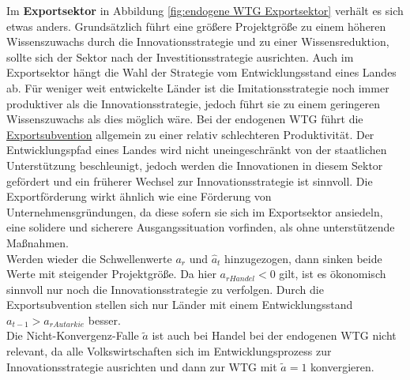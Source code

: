 %
Im \textbf{Exportsektor} in Abbildung \ref{fig:endogene WTG Exportsektor} verhält es sich etwas anders. Grundsätzlich führt eine größere Projektgröße zu einem höheren Wissenszuwachs durch die \textcolor[rgb]{0.74,0.97,0.22}{Innovationsstrategie} und zu einer Wissensreduktion, sollte sich der Sektor nach der \textcolor[rgb]{0,0.32,0}{Investitionsstrategie} ausrichten. Auch im Exportsektor hängt die Wahl der Strategie vom Entwicklungsstand eines Landes ab. Für weniger weit entwickelte Länder ist die \textcolor[rgb]{0,0.32,0}{Imitationsstrategie} noch immer produktiver als die \textcolor[rgb]{0.74,0.97,0.22}{Innovationsstrategie}, jedoch führt sie zu einem geringeren Wissenszuwachs als dies  möglich wäre. Bei der endogenen WTG führt die \uline{Exportsubvention} allgemein zu einer relativ schlechteren Produktivität. Der Entwicklungspfad eines Landes wird nicht uneingeschränkt von der staatlichen Unterstützung beschleunigt, jedoch werden die Innovationen in diesem Sektor gefördert und ein früherer Wechsel zur \textcolor[rgb]{0.74,0.97,0.22}{Innovationsstrategie} ist sinnvoll. Die Exportförderung wirkt ähnlich wie eine Förderung von Unternehmensgründungen, da diese sofern sie sich im Exportsektor ansiedeln, eine solidere und sicherere Ausgangssituation vorfinden, als ohne unterstützende Maßnahmen.\\
%
Werden wieder die Schwellenwerte $a_r$ und $\hat{a}_t$ hinzugezogen, dann sinken beide Werte mit steigender Projektgröße. Da hier $a_{rHandel}<0$ gilt, ist es ökonomisch sinnvoll nur noch die \textcolor[rgb]{0.74,0.97,0.22}{Innovationsstrategie} zu verfolgen. Durch die Exportsubvention stellen sich nur Länder mit einem Entwicklungsstand $a_{t-1}>a_{rAutarkie}$ besser.\\
%
Die Nicht-Konvergenz-Falle $\tilde{a}$ ist auch bei Handel bei der endogenen WTG nicht relevant, da alle Volkswirtschaften sich im Entwicklungsprozess zur Innovationsstrategie ausrichten und dann zur WTG mit $\tilde{a}=1$ konvergieren. 
%
